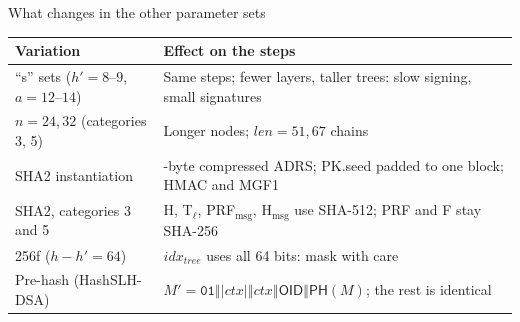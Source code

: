 \documentclass[aspectratio=169,11pt]{beamer}
\newcommand{\cat}{\mathbin{\Vert}}
\newcommand{\hx}[1]{\texttt{#1}}
\begin{document}
\begin{frame}{What changes in the other parameter sets}
  \small
  \begin{tabular}{@{}>{\raggedright\arraybackslash}p{4.4cm} >{\raggedright\arraybackslash}p{9.6cm}@{}}
    \toprule
    Variation & Effect on the steps \\
    \midrule
    ``s'' sets ($h'=8$--$9$, $a=12$--$14$) & Same steps; fewer layers, taller trees: slow signing, small signatures \\
    $n = 24, 32$ (categories 3, 5) & Longer nodes; $\mathit{len} = 51, 67$ chains \\
    SHA2 instantiation & 22-byte compressed ADRS; PK.seed padded to one block; HMAC and MGF1 \\
    SHA2, categories 3 and 5 & H, T$_\ell$, PRF$_{\text{msg}}$, H$_{\text{msg}}$ use SHA-512; PRF and F stay SHA-256 \\
    256f ($h - h' = 64$) & $\mathit{idx}_{\mathit{tree}}$ uses all 64 bits: mask with care \\
    Pre-hash (HashSLH-DSA) & $M' = \hx{01} \cat |\mathit{ctx}| \cat \mathit{ctx} \cat \mathsf{OID} \cat \mathsf{PH}(M)$; the rest is identical \\
    \bottomrule
  \end{tabular}
\end{frame}
\end{document}
